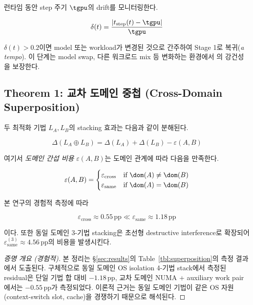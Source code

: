 런타임 동안 step 주기 $\tgpu$의 drift를 모니터링한다.

\begin{equation}
\delta(t) = \frac{|t_{\text{step}}(t) - \tgpu|}{\tgpu}
\end{equation}

$\delta(t) > 0.2$이면 model 또는 workload가 변경된 것으로 간주하여 Stage 1로 복귀(\emph{a tempo}).
이 단계는 model swap, 다른 워크로드 mix 등 변화하는 환경에서 \algname 의 강건성을 보장한다.

\subsection{Theorem 1: 교차 도메인 중첩 (Cross-Domain Superposition)}
\label{subsec:theorem1}

\begin{theorem}
\label{thm:superposition}
두 최적화 기법 $L_A, L_B$의 stacking 효과는 다음과 같이 분해된다.

\begin{equation}
\Delta(L_A \oplus L_B) = \Delta(L_A) + \Delta(L_B) - \varepsilon(A, B)
\label{eq:superposition}
\end{equation}

여기서 \emph{도메인 간섭 비용} $\varepsilon(A, B)$는 도메인 관계에 따라 다음을 만족한다.

\begin{equation}
\varepsilon(A, B) = \begin{cases}
\varepsilon_{\text{cross}} & \text{if } \dom(A) \neq \dom(B) \\
\varepsilon_{\text{same}} & \text{if } \dom(A) = \dom(B)
\end{cases}
\end{equation}

본 연구의 경험적 측정에 따라

\begin{equation}
\varepsilon_{\text{cross}} \approx 0.55\,\mathrm{pp} \ll \varepsilon_{\text{same}} \approx 1.18\,\mathrm{pp}
\end{equation}

이다. 또한 동일 도메인 3-기법 stacking은 초선형 destructive interference로 확장되어 $\varepsilon_{\text{same}}^{(3)} \approx 4.56\,\mathrm{pp}$의 비용을 발생시킨다.
\end{theorem}

\begin{proof}[증명 개요 (경험적)]
본 정리는 \S\ref{sec:results}의 Table~\ref{tbl:superposition}의 측정 결과에서 도출된다.
구체적으로 동일 도메인 OS isolation 4-기법 stack에서 측정된 residual은 단일 기법 합 대비 $-1.18$\,pp, 교차 도메인 NUMA + auxiliary work pair에서는 $-0.55$\,pp가 측정되었다.
이론적 근거는 동일 도메인 기법이 같은 OS 자원(context-switch slot, cache)을 경쟁하기 때문으로 해석된다.
\end{proof}

